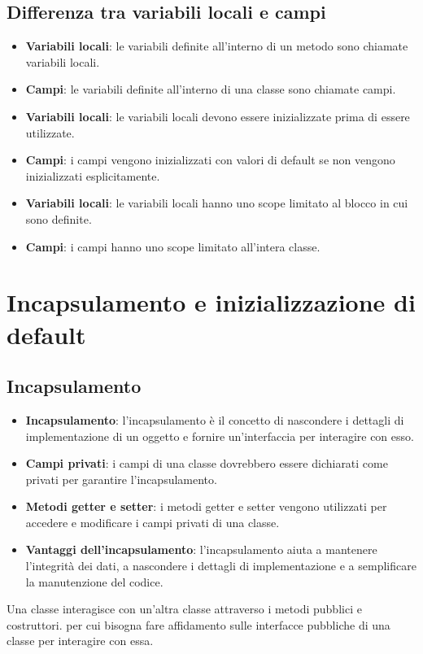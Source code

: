 \documentclass[11pt]{article}
\begin{document}
\subsection{Differenza tra variabili locali e campi}
\begin{itemize}
    \item \textbf{Variabili locali}: le variabili definite all'interno di un metodo sono chiamate variabili locali.
    \item \textbf{Campi}: le variabili definite all'interno di una classe sono chiamate campi.
    \item \textbf{Variabili locali}: le variabili locali devono essere inizializzate prima di essere utilizzate.
    \item \textbf{Campi}: i campi vengono inizializzati con valori di default se non vengono inizializzati esplicitamente.
    \item \textbf{Variabili locali}: le variabili locali hanno uno scope limitato al blocco in cui sono definite.
    \item \textbf{Campi}: i campi hanno uno scope limitato all'intera classe.
\end{itemize}

\section{Incapsulamento e inizializzazione di default}
\subsection{Incapsulamento}
\begin{itemize}
    \item \textbf{Incapsulamento}: l'incapsulamento è il concetto di nascondere i dettagli di implementazione di un oggetto e fornire un'interfaccia per interagire con esso.
    \item \textbf{Campi privati}: i campi di una classe dovrebbero essere dichiarati come privati per garantire l'incapsulamento.
    \item \textbf{Metodi getter e setter}: i metodi getter e setter vengono utilizzati per accedere e modificare i campi privati di una classe.
    \item \textbf{Vantaggi dell'incapsulamento}: l'incapsulamento aiuta a mantenere l'integrità dei dati, a nascondere i dettagli di implementazione e a semplificare la manutenzione del codice.
\end{itemize}
Una classe interagisce con un'altra classe attraverso i metodi pubblici e costruttori. per cui bisogna fare affidamento sulle interfacce pubbliche di una classe per interagire con essa.
\end{document}

